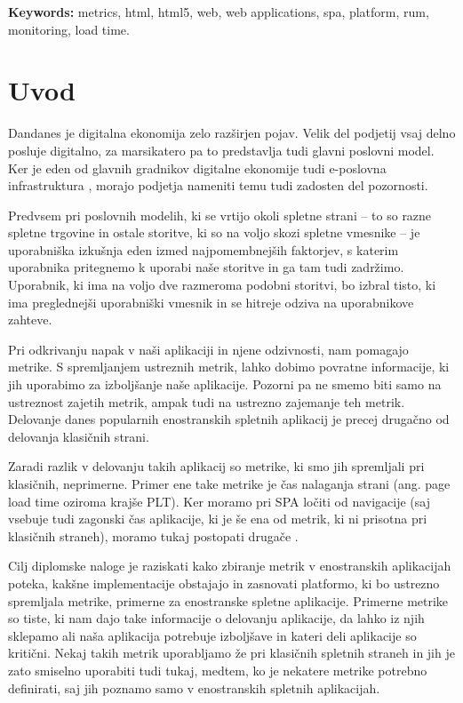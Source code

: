 \documentclass[a4paper, 12pt]{book}
\newcommand{\tkeywordsEn}{metrics, html, html5, web, web applications, spa, platform, rum, monitoring, load time}
\newcommand{\clearemptydoublepage}{\newpage{\pagestyle{empty}\cleardoublepage}}
\begin{document}
\bigskip

\noindent\textbf{Keywords:} \tkeywordsEn.
\clearemptydoublepage

\mainmatter
\setcounter{page}{1}
\pagestyle{fancy}

\chapter{Uvod}

Dandanes je digitalna ekonomija zelo razširjen pojav. Velik del podjetij vsaj delno posluje digitalno, za marsikatero pa to predstavlja tudi glavni poslovni model. Ker je eden od glavnih gradnikov digitalne ekonomije tudi e-poslovna infrastruktura \cite{digital_econ}, morajo podjetja nameniti temu tudi zadosten del pozornosti.

Predvsem pri poslovnih modelih, ki se vrtijo okoli spletne strani – to so razne spletne trgovine in ostale storitve, ki so na voljo skozi spletne vmesnike – je uporabniška izkušnja eden izmed najpomembnejših faktorjev, s katerim uporabnika pritegnemo k uporabi naše storitve in ga tam tudi zadržimo. Uporabnik, ki ima na voljo dve razmeroma podobni storitvi, bo izbral tisto, ki ima preglednejši uporabniški vmesnik in se hitreje odziva na uporabnikove zahteve. 

Pri odkrivanju napak v naši aplikaciji in njene odzivnosti, nam pomagajo metrike. S spremljanjem ustreznih metrik, lahko dobimo povratne informacije, ki jih uporabimo za izboljšanje naše aplikacije. Pozorni pa ne smemo biti samo na ustreznost zajetih metrik, ampak tudi na ustrezno zajemanje teh metrik. Delovanje danes popularnih enostranskih spletnih aplikacij je precej drugačno od delovanja klasičnih strani.

Zaradi razlik v delovanju takih aplikacij so metrike, ki smo jih spremljali pri klasičnih, neprimerne. Primer ene take metrike je čas nalaganja strani (ang. page load time oziroma krajše PLT). Ker moramo pri SPA ločiti  od  navigacije (saj  vsebuje tudi zagonski čas aplikacije, ki je še ena od metrik, ki ni prisotna pri klasičnih straneh), moramo tukaj postopati drugače \cite{hard_vs_soft_navigation} \cite{spa_presentation}.

Cilj diplomske naloge je raziskati kako zbiranje metrik v enostranskih aplikacijah poteka, kakšne implementacije obstajajo in zasnovati platformo, ki bo ustrezno spremljala metrike, primerne za enostranske spletne aplikacije. Primerne metrike so tiste, ki nam dajo take informacije o delovanju aplikacije, da lahko iz njih sklepamo ali naša aplikacija potrebuje izboljšave in kateri deli aplikacije so kritični. Nekaj takih metrik uporabljamo že pri klasičnih spletnih straneh in jih je zato smiselno uporabiti tudi tukaj, medtem, ko je nekatere metrike potrebno definirati, saj jih poznamo samo v enostranskih spletnih aplikacijah.
\end{document}

